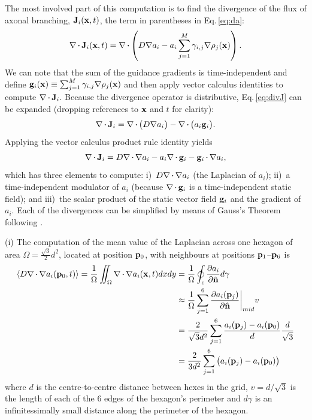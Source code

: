 \documentclass[9pt,lineno]{elife}
\begin{document}
The most involved part of this computation is to find the divergence of the
flux of axonal branching, $\mathbf{J}_i(\mathbf{x},t)$, the term in parentheses in
Eq.\,\ref{eq:da}:
%
\begin{equation}
  \label{eq:divJ}
  \nabla\vcdot\mb{J}_i(\mb{x},t) = \nabla\vcdot\left(D \nabla a_i-a_i\sum_{j=1}^{M} \gamma_{i,j}\nabla \rho_j(\mb{x})\right).
\end{equation}
%
We can note that the sum of the guidance gradients is time-independent and
define $\mathbf{g}_i(\mathbf{x}) \equiv \sum_{j=1}^{M} \gamma_{i,j} \nabla
\rho_j(\mathbf{x})$ and then apply vector calculus identities to compute
$\nabla\vcdot\mb{J}_i$. Because the divergence operator is distributive,
Eq.\,\ref{eq:divJ} can be expanded (dropping references to $\mathbf{x}$ and $t$
for clarity):
%
\begin{equation}
\nabla\vcdot\mb{J}_i = \nabla\vcdot\big(D \nabla a_i\big) - \nabla\vcdot\big(a_i \mb{g}_i\big).
\end{equation}
%
Applying the vector calculus product rule identity yields
%
\begin{equation} \label{eq:divJExpanded}
%
\nabla\vcdot\mb{J}_i =
%
D \dvrg a_i %
-
a_i\nabla\vcdot\mb{g}_i %
-
\mb{g}_i\vcdot\nabla a_i %
,
\end{equation}
%
which has three elements to compute: i)~$D \dvrg a_i$ (the Laplacian of
$a_i$); ii)~a time-independent modulator of $a_i$ (because
$\nabla\vcdot\mb{g}_i$ is a time-independent static field); and iii)~the
scalar product of the static vector field $\mathbf{g}_i$ and the gradient of
$a_i$. Each of the divergences can be simplified by means of Gauss's Theorem
following \cite{lee_hexagonal_2014}.

(i) The computation of the mean value of the Laplacian across one hexagon of
area $\Omega = \frac{\sqrt{3}}{2}d^2$, located at position $\mathbf{p}_0$, with
neighbours at positions $\mathbf{p}_1$--$\mathbf{p}_6$ is
%
\begin{equation} \label{eq:lapl}
\begin{split}
\langle D \dvrg a_i(\mb{p}_0,t) \rangle  = \frac{1}{\Omega} \iint_\Omega \dvrg a_i(\mb{x}, t) dxdy & = \frac{1}{\Omega} \oint_c \frac{\partial a_i}{\partial \hat{\mb{n}}} d\gamma \\
& \approx \frac{1}{\Omega} \sum_{j=1}^6 \frac{\partial a_i(\mb{p}_j)}{\partial \hat{\mb{n}}} \bigg\rvert_{mid} v \\
& = \frac{2}{\sqrt{3} d^2} \sum_{j=1}^6 \frac{a_i(\mb{p}_j) - a_i(\mb{p}_0)}{d} \frac{d}{\sqrt{3}} \\
& = \frac{2}{3 d^2} \sum_{j=1}^6 \big(a_i(\mb{p}_j) - a_i(\mb{p}_0)\big)
\end{split}
\end{equation}
%
where $d$ is the centre-to-centre distance between hexes in the grid, $v =
d/\sqrt{3}$ is the length of each of the 6 edges of the hexagon's perimeter
and $d\gamma$ is an infinitessimally small distance along the perimeter of the
hexagon.
\end{document}
